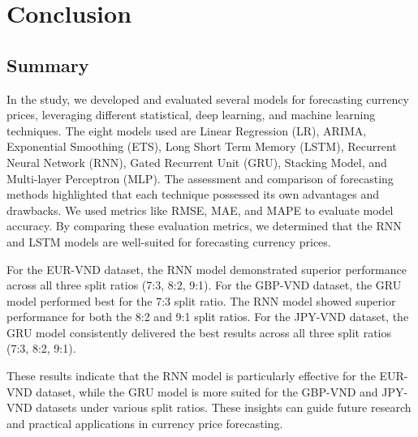 \documentclass{ieeeojies}
\begin{document}
\section{Conclusion}
\subsection{Summary}

In the study, we developed and evaluated several models for forecasting currency prices, leveraging different statistical, deep learning, and machine learning techniques. The eight models used are Linear Regression (LR), ARIMA, Exponential Smoothing (ETS), Long Short Term Memory (LSTM), Recurrent Neural Network (RNN), Gated Recurrent Unit (GRU), Stacking Model, and Multi-layer Perceptron (MLP). The assessment and comparison of forecasting methods highlighted that each technique possessed its own advantages and drawbacks. We used metrics like RMSE, MAE, and MAPE to evaluate model accuracy. By comparing these evaluation metrics, we determined that the RNN and LSTM models are well-suited for forecasting currency prices. 

For the EUR-VND dataset, the RNN model demonstrated superior performance across all three split ratios (7:3, 8:2, 9:1). For the GBP-VND dataset, the GRU model performed best for the 7:3 split ratio. The RNN model showed superior performance for both the 8:2 and 9:1 split ratios. For the JPY-VND dataset, the GRU model consistently delivered the best results across all three split ratios (7:3, 8:2, 9:1).

These results indicate that the RNN model is particularly effective for the EUR-VND dataset, while the GRU model is more suited for the GBP-VND and JPY-VND datasets under various split ratios. These insights can guide future research and practical applications in currency price forecasting.
 
\end{document}
